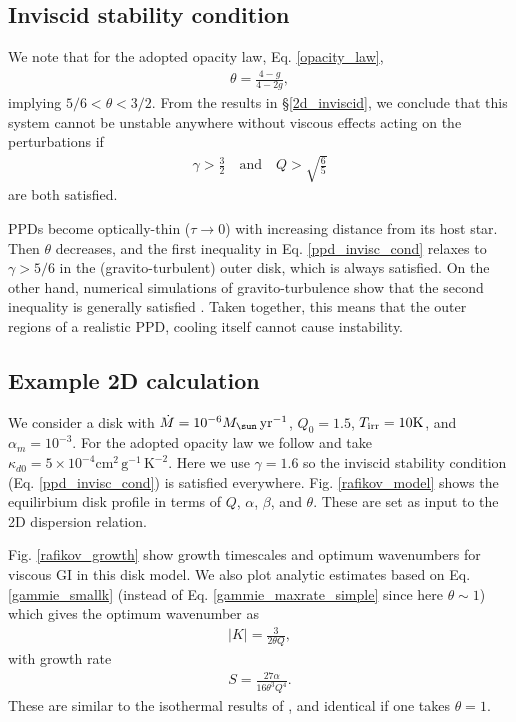 \subsection{Inviscid stability condition}
We note that for the adopted opacity law, Eq. \ref{opacity_law}, 
\begin{align*}
  \theta = \frac{4-g}{4-2g},
\end{align*}
implying $5/6<\theta<3/2$. 
From the results in \S\ref{2d_inviscid}, we conclude that this
system cannot be unstable anywhere without
viscous effects acting on the perturbations if 
\begin{align}
  \gamma > \frac{3}{2} \quad \text{and} \quad Q >
  \sqrt{\frac{6}{5}} \label{ppd_invisc_cond} 
\end{align} 
are both satisfied.  

PPDs become optically-thin ($\tau\to 0$) with 
increasing distance from its host star. Then $\theta$ decreases, and
the first inequality in Eq. \ref{ppd_invisc_cond} relaxes to $\gamma >
5/6$ in the (gravito-turbulent) outer disk, which is always satisfied.  
On the other hand, numerical simulations of gravito-turbulence
show that the second inequality is generally satisfied \citep{rice11}.  
Taken together, this means that the outer regions of a realistic PPD,
cooling itself cannot cause instability.  


\subsection{Example 2D calculation}\label{pp2d_example}
We consider a disk with $\dot{M} = 10^{-6}M_\sun\,\yr^{-1}$, $Q_0=1.5$, 
$T_\mathrm{irr}=10\mathrm{K}$, and $\alpha_m=10^{-3}$. For the adopted opacity
law we follow \citeauthor{rafikov15} and take $\kappa_{d0} =
5\times10^{-4}\mathrm{cm}^2\,\mathrm{g}^{-1}\,\mathrm{K}^{-2}$. Here we use
$\gamma=1.6$ so the inviscid stability condition
(Eq. \ref{ppd_invisc_cond}) is satisfied
everywhere. Fig. \ref{rafikov_model} shows the equilirbium 
disk profile in terms of $Q$, $\alpha$, $\beta$, and $\theta$.  
These are set as input to the 2D dispersion relation.  

Fig. \ref{rafikov_growth} show growth timescales and
optimum wavenumbers for viscous GI in this disk model.  
We also plot analytic estimates based on Eq. \ref{gammie_smallk} (instead of
Eq. \ref{gammie_maxrate_simple} since here $\theta\sim 1$) 
which gives the optimum wavenumber as
\begin{align}
  |K| = \frac{3}{2\theta Q},
\end{align}
with growth rate
\begin{align} 
  S = \frac{27\alpha}{16\theta^3Q^4}. 
\end{align}
These are similar to the isothermal results of
\citet[][their Eq. 19 and 21, respectively]{sterzik95}, and identical if one
takes $\theta=1$. 
 

